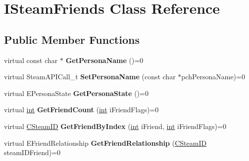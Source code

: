 \hypertarget{classISteamFriends}{}\section{I\+Steam\+Friends Class Reference}
\label{classISteamFriends}
\subsection*{Public Member Functions}
\begin{DoxyCompactItemize}
\item 
\hypertarget{classISteamFriends_a72b5269acb1134b148827644ed401ee5}{}virtual const char $\ast$ {\bfseries Get\+Persona\+Name} ()=0\label{classISteamFriends_a72b5269acb1134b148827644ed401ee5}

\item 
\hypertarget{classISteamFriends_a6bd31942dd75ba2ccc11b9ab2fed5b01}{}virtual Steam\+A\+P\+I\+Call\+\_\+t {\bfseries Set\+Persona\+Name} (const char $\ast$pch\+Persona\+Name)=0\label{classISteamFriends_a6bd31942dd75ba2ccc11b9ab2fed5b01}

\item 
\hypertarget{classISteamFriends_a09e87434f6f5d1d9e037c3673d53ab59}{}virtual E\+Persona\+State {\bfseries Get\+Persona\+State} ()=0\label{classISteamFriends_a09e87434f6f5d1d9e037c3673d53ab59}

\item 
\hypertarget{classISteamFriends_abbb75008d56eec2f81ce361476d3f7f2}{}virtual \hyperlink{SDL__thread_8h_a6a64f9be4433e4de6e2f2f548cf3c08e}{int} {\bfseries Get\+Friend\+Count} (\hyperlink{SDL__thread_8h_a6a64f9be4433e4de6e2f2f548cf3c08e}{int} i\+Friend\+Flags)=0\label{classISteamFriends_abbb75008d56eec2f81ce361476d3f7f2}

\item 
\hypertarget{classISteamFriends_ab9b45dfe53f34f301ecc6b12efed0a5e}{}virtual \hyperlink{classCSteamID}{C\+Steam\+I\+D} {\bfseries Get\+Friend\+By\+Index} (\hyperlink{SDL__thread_8h_a6a64f9be4433e4de6e2f2f548cf3c08e}{int} i\+Friend, \hyperlink{SDL__thread_8h_a6a64f9be4433e4de6e2f2f548cf3c08e}{int} i\+Friend\+Flags)=0\label{classISteamFriends_ab9b45dfe53f34f301ecc6b12efed0a5e}

\item 
\hypertarget{classISteamFriends_a44b9f74602d60cd1a526947a517e5c4a}{}virtual E\+Friend\+Relationship {\bfseries Get\+Friend\+Relationship} (\hyperlink{classCSteamID}{C\+Steam\+I\+D} steam\+I\+D\+Friend)=0\label{classISteamFriends_a44b9f74602d60cd1a526947a517e5c4a}


\end{DoxyCompactItemize}
